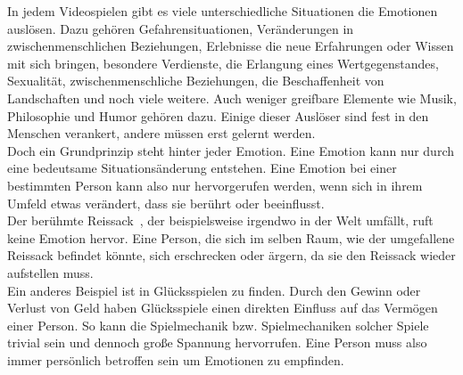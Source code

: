 In jedem Videospielen gibt es viele unterschiedliche Situationen die Emotionen auslösen. Dazu gehören Gefahrensituationen, Veränderungen in zwischenmenschlichen Beziehungen, Erlebnisse die neue Erfahrungen oder Wissen mit sich bringen, besondere Verdienste, die Erlangung eines Wertgegenstandes, Sexualität, zwischenmenschliche Beziehungen, die Beschaffenheit von Landschaften und noch viele weitere. Auch weniger greifbare Elemente wie Musik, Philosophie und Humor gehören dazu. Einige dieser Auslöser sind fest in den Menschen verankert, andere müssen erst gelernt werden. \\
Doch ein Grundprinzip steht hinter jeder Emotion. Eine Emotion kann nur durch eine bedeutsame Situationsänderung entstehen. Eine Emotion bei einer bestimmten Person kann also nur hervorgerufen werden, wenn sich in ihrem Umfeld etwas verändert, dass sie berührt oder beeinflusst.\\
Der \glqq berühmte Reissack\grqq\ , der beispielsweise irgendwo in der Welt umfällt, ruft keine Emotion hervor. Eine Person, die sich im selben Raum, wie der umgefallene Reissack befindet könnte, sich erschrecken oder ärgern, da sie den Reissack wieder aufstellen muss. \\
Ein anderes Beispiel ist in Glücksspielen zu finden. Durch den Gewinn oder Verlust von Geld haben Glücksspiele einen direkten Einfluss auf das Vermögen einer Person. So kann die Spielmechanik bzw. Spielmechaniken solcher Spiele trivial sein und dennoch große Spannung hervorrufen. Eine Person muss also immer persönlich betroffen sein um Emotionen zu empfinden.\\
